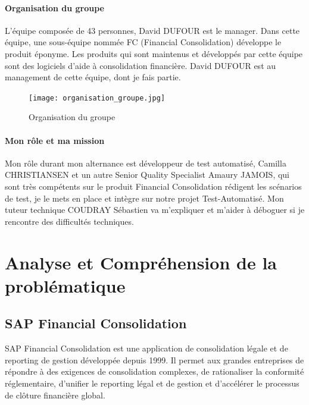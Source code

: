         \paragraph{Organisation du groupe} L'équipe composée de 43 personnes, David DUFOUR est le manager. Dans cette équipe, une sous-équipe nommée FC (Financial Consolidation) développe le produit éponyme. Les produits qui sont maintenus et développés par cette équipe sont des logiciels d’aide à consolidation financière. David DUFOUR est au management de cette équipe, dont je fais partie. 
        
        
        \begin{figure}[H]
            \centering
            \texttt{[image: organisation\_groupe.jpg]}
            \caption{Organisation du groupe}
            \label{fig:group_organization_label}
        \end{figure}
        
        \paragraph{Mon rôle et ma mission}
        Mon rôle durant mon alternance est développeur de test automatisé, Camilla CHRISTIANSEN et un autre Senior Quality Specialist Amaury JAMOIS, qui sont très compétents sur le produit Financial Consolidation rédigent les scénarios de test, je le mets en place et intègre sur notre projet Test-Automatisé. Mon tuteur technique COUDRAY Sébastien va m'expliquer et m'aider à déboguer si je rencontre des difficultés techniques.
\newpage
\section{Analyse et Compréhension de la problématique}

\subsection{SAP Financial Consolidation}
\label{subsec: SAP Fiancial Consolidation}
\par SAP Financial Consolidation est une application de consolidation légale et de reporting de gestion développée depuis 1999. Il permet aux grandes entreprises de répondre à des exigences de consolidation complexes, de rationaliser la conformité réglementaire, d'unifier le reporting légal et de gestion et d'accélérer le processus de clôture financière global.\cite{About-FC}


